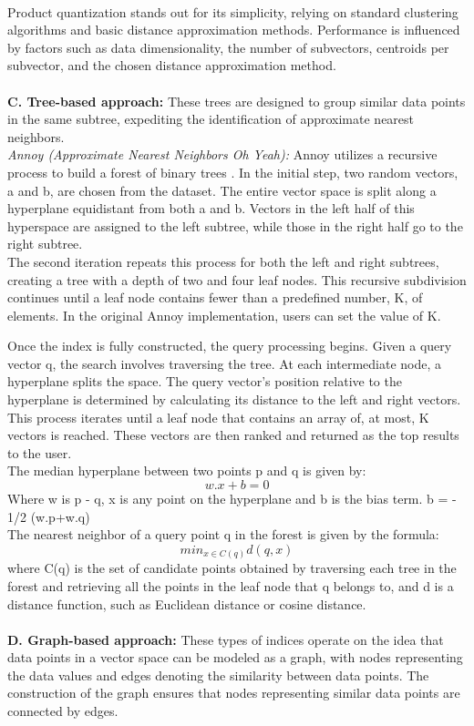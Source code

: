 \documentclass[conference]{IEEEtran}
\begin{document}
\\Product quantization stands out for its simplicity, relying on standard clustering algorithms and basic distance approximation methods. Performance is influenced by factors such as data dimensionality, the number of subvectors, centroids per subvector, and the chosen distance approximation method.
\\
\\
\textbf{C. Tree-based approach:} These trees are designed to group similar data points in the same subtree, expediting the identification of approximate nearest neighbors. 
\\
\textit{Annoy (Approximate Nearest Neighbors Oh Yeah):} Annoy utilizes a recursive process to build a forest of binary trees \cite{ref1}. In the initial step, two random vectors, a and b, are chosen from the dataset. The entire vector space is split along a hyperplane equidistant from both a and b. Vectors in the left half of this hyperspace are assigned to the left subtree, while those in the right half go to the right subtree. 
\\
The second iteration repeats this process for both the left and right subtrees, creating a tree with a depth of two and four leaf nodes. This recursive subdivision continues until a leaf node contains fewer than a predefined number, K, of elements. In the original Annoy implementation, users can set the value of K.

Once the index is fully constructed, the query processing begins. Given a query vector q, the search involves traversing the tree. At each intermediate node, a hyperplane splits the space. The query vector's position relative to the hyperplane is determined by calculating its distance to the left and right vectors. This process iterates until a leaf node that contains an array of, at most, K vectors is reached. These vectors are then ranked and returned as the top results to the user.
\\
The median hyperplane between two points p and q is given by:
\[w.x + b = 0 \]
Where w is p - q, x is any point on the hyperplane and b is the bias term. b = - 1/2 (w.p+w.q)
\\
The nearest neighbor of a query point q in the forest is given by the formula:
\[min_{x \in C(q)} d(q, x) \]
where C(q) is the set of candidate points obtained by traversing each tree in the forest and retrieving all the points in the leaf node that q belongs to, and d is a distance function, such as Euclidean distance or cosine distance.
\\
\\
\textbf{D. Graph-based approach:} These types of indices operate on the idea that data points in a vector space can be modeled as a graph, with nodes representing the data values and edges denoting the similarity between data points. The construction of the graph ensures that nodes representing similar data points are connected by edges. 
\end{document}

